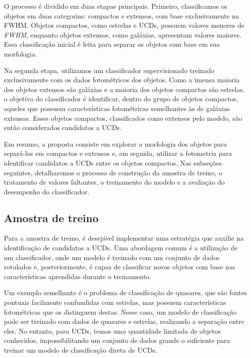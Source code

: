 O processo é dividido em duas etapas principais. Primeiro, classificamos os objetos em duas categorias: compactos e extensos, com base exclusivamente na \ac{FWHM}. Objetos compactos, como estrelas e UCDs, possuem valores menores de \textit{FWHM}, enquanto objetos extensos, como galáxias, apresentam valores maiores. Essa classificação inicial é feita para separar os objetos com base em sua morfologia.

Na segunda etapa, utilizamos um classificador supervisionado treinado exclusivamente com os dados fotométricos dos objetos. Como a imensa maioria dos objetos extensos são galáxias e a maioria dos objetos compactos são estrelas, o objetivo do classificador é identificar, dentro do grupo de objetos compactos, aqueles que possuem características fotométricas semelhantes às de galáxias extensas. Esses objetos compactos, classificados como extensos pelo modelo, são então considerados candidatos a UCDs.

Em resumo, a proposta consiste em explorar a morfologia dos objetos para separá-los em compactos e extensos e, em seguida, utilizar a fotometria para identificar candidatos a UCDs entre os objetos compactos. Nas subseções seguintes, detalharemos o processo de construção da amostra de treino, o tratamento de valores faltantes, o treinamento do modelo e a avaliação do desempenho do classificador.



\subsection{Amostra de treino}\label{subsec:amostra_treino}
Para a amostra de treino, é desejável implementar uma estratégia que auxilie na identificação de candidatas a UCDs. Uma abordagem comum é a utilização de um classificador, onde um modelo é treinado com um conjunto de dados rotulados e, posteriormente, é capaz de classificar novos objetos com base nas características aprendidas durante o treinamento.

Um exemplo semelhante é o problema de classificação de quasares, que são fontes pontuais facilmente confundidas com estrelas, mas possuem características fotométricas que os distinguem destas. Nesse caso, um modelo de classificação pode ser treinado com dados de quasares e estrelas, realizando a separação entre eles. No entanto, para UCDs, temos uma quantidade limitada de objetos conhecidos, impossibilitando um conjunto de dados grande o suficiente para treinar um modelo de classificação direta de UCDs.

